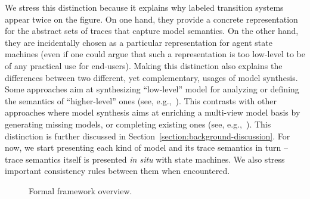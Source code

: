 We stress this distinction because it explains why labeled transition systems appear twice on the figure. On one hand, they provide a concrete representation for the abstract sets of traces that capture model semantics. On the other hand, they are incidentally chosen as a particular representation for agent state machines (even if one could argue that such a representation is too low-level to be of any practical use for end-users). Making this distinction also explains the differences between two different, yet complementary, usages of model synthesis. Some approaches aim at synthesizing ``low-level'' model for analyzing or defining the semantics of ``higher-level'' ones (see, e.g.,~\cite{Magee:1997, Uchitel:2003, Damas:2009}). This contrasts with other approaches where model synthesis aims at enriching a multi-view model basis by generating missing models, or completing existing ones (see, e.g.,~\cite{VanLamsweerde:1998, Whittle:2000, Uchitel:2004, Damas:2005}). This distinction is further discussed in Section~\ref{section:background-discussion}. For now, we start presenting each kind of model and its trace semantics in turn -- trace semantics itself is presented \emph{in situ} with state machines. We also stress important consistency rules between them when encountered.

\begin{figure}[t]\centering
  \caption{Formal framework overview.\label{image:framework}}
\end{figure}


